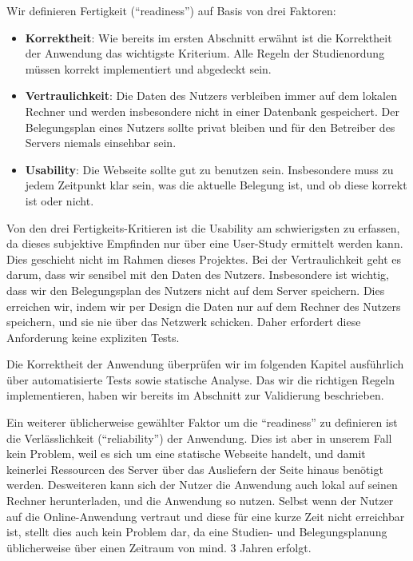 \documentclass[ngerman]{article}
\begin{document}
Wir definieren Fertigkeit (``readiness'') auf Basis von drei Faktoren:

\begin{itemize}
    \item \textbf{Korrektheit}:
        Wie bereits im ersten Abschnitt erwähnt ist die Korrektheit der Anwendung das wichtigste Kriterium.
        Alle Regeln der Studienordung müssen korrekt implementiert und abgedeckt sein.
    \item \textbf{Vertraulichkeit}:
        Die Daten des Nutzers verbleiben immer auf dem lokalen Rechner und werden insbesondere nicht in einer Datenbank gespeichert.
        Der Belegungsplan eines Nutzers sollte privat bleiben und für den Betreiber des Servers niemals einsehbar sein.
    \item \textbf{Usability}:
        Die Webseite sollte gut zu benutzen sein.
        Insbesondere muss zu jedem Zeitpunkt klar sein, was die aktuelle Belegung ist, und ob diese korrekt ist oder nicht.
\end{itemize}

Von den drei Fertigkeits-Kritieren ist die Usability am schwierigsten zu erfassen, da dieses subjektive Empfinden nur über eine User-Study ermittelt werden kann.
Dies geschieht nicht im Rahmen dieses Projektes.
Bei der Vertraulichkeit geht es darum, dass wir sensibel mit den Daten des Nutzers.
Insbesondere ist wichtig, dass wir den Belegungsplan des Nutzers nicht auf dem Server speichern.
Dies erreichen wir, indem wir per Design die Daten nur auf dem Rechner des Nutzers speichern, und sie nie über das Netzwerk schicken.
Daher erfordert diese Anforderung keine expliziten Tests.

Die Korrektheit der Anwendung überprüfen wir im folgenden Kapitel ausführlich über automatisierte Tests sowie statische Analyse.
Das wir die richtigen Regeln implementieren, haben wir bereits im Abschnitt zur Validierung beschrieben.

Ein weiterer üblicherweise gewählter Faktor um die ``readiness'' zu definieren ist die Verlässlichkeit (``reliability'') der Anwendung.
Dies ist aber in unserem Fall kein Problem, weil es sich um eine statische Webseite handelt, und damit keinerlei Ressourcen des Server über das Ausliefern der Seite hinaus benötigt werden.
Desweiteren kann sich der Nutzer die Anwendung auch lokal auf seinen Rechner herunterladen, und die Anwendung so nutzen.
Selbst wenn der Nutzer auf die Online-Anwendung vertraut und diese für eine kurze Zeit nicht erreichbar ist, stellt dies auch kein Problem dar, da eine Studien- und Belegungsplanung üblicherweise über einen Zeitraum von mind. 3 Jahren erfolgt.
\end{document}
